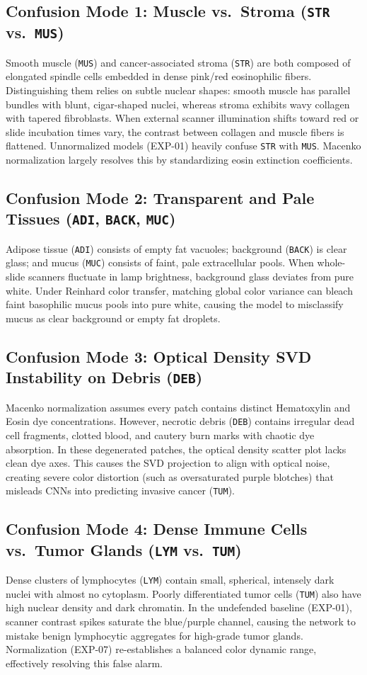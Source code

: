 \documentclass[11pt,a4paper]{article}
\begin{document}
\subsection{Confusion Mode 1: Muscle vs.\ Stroma (\texttt{STR} vs.\ \texttt{MUS})}
Smooth muscle (\texttt{MUS}) and cancer-associated stroma (\texttt{STR}) are both composed of elongated spindle cells embedded in dense pink/red eosinophilic fibers. Distinguishing them relies on subtle nuclear shapes: smooth muscle has parallel bundles with blunt, cigar-shaped nuclei, whereas stroma exhibits wavy collagen with tapered fibroblasts. When external scanner illumination shifts toward red or slide incubation times vary, the contrast between collagen and muscle fibers is flattened. Unnormalized models (EXP-01) heavily confuse \texttt{STR} with \texttt{MUS}. Macenko normalization largely resolves this by standardizing eosin extinction coefficients.

\subsection{Confusion Mode 2: Transparent and Pale Tissues (\texttt{ADI}, \texttt{BACK}, \texttt{MUC})}
Adipose tissue (\texttt{ADI}) consists of empty fat vacuoles; background (\texttt{BACK}) is clear glass; and mucus (\texttt{MUC}) consists of faint, pale extracellular pools. When whole-slide scanners fluctuate in lamp brightness, background glass deviates from pure white. Under Reinhard color transfer, matching global color variance can bleach faint basophilic mucus pools into pure white, causing the model to misclassify mucus as clear background or empty fat droplets.

\subsection{Confusion Mode 3: Optical Density SVD Instability on Debris (\texttt{DEB})}
Macenko normalization assumes every patch contains distinct Hematoxylin and Eosin dye concentrations. However, necrotic debris (\texttt{DEB}) contains irregular dead cell fragments, clotted blood, and cautery burn marks with chaotic dye absorption. In these degenerated patches, the optical density scatter plot lacks clean dye axes. This causes the SVD projection to align with optical noise, creating severe color distortion (such as oversaturated purple blotches) that misleads CNNs into predicting invasive cancer (\texttt{TUM}).

\subsection{Confusion Mode 4: Dense Immune Cells vs.\ Tumor Glands (\texttt{LYM} vs.\ \texttt{TUM})}
Dense clusters of lymphocytes (\texttt{LYM}) contain small, spherical, intensely dark nuclei with almost no cytoplasm. Poorly differentiated tumor cells (\texttt{TUM}) also have high nuclear density and dark chromatin. In the undefended baseline (EXP-01), scanner contrast spikes saturate the blue/purple channel, causing the network to mistake benign lymphocytic aggregates for high-grade tumor glands. Normalization (EXP-07) re-establishes a balanced color dynamic range, effectively resolving this false alarm.
\end{document}
